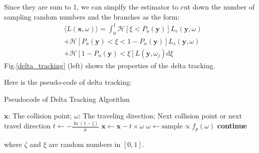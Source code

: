 \documentclass[acmtog]{acmart}
\begin{document}
Since they are sum to 1, we can simplfy the estimator to cut down the number of sampling random numbers and the branches as the form:
\begin{equation}
	\begin{aligned}
		&\langle L(\mathbf x,\omega)\rangle=\int_0^1\mathcal H[\xi<P_a(\mathbf y)]L_e(\mathbf y,\omega)\\
		&+\mathcal H[P_a(\mathbf y)<\xi<1-P_n(\mathbf y)]L_s(\mathbf y,\omega)\\
		&+\mathcal H[1-P_n(\mathbf y)<\xi]L(\mathbf y,\omega_j)\mathrm d\xi
	\end{aligned}
\end{equation}
Fig.\ref{delta_tracking} (left) shows the properties of the delta tracking.


Here is the pseudo-code of delta tracking:
\begin{algorithm}[H]
	\caption{Pseudocode of Delta Tracking Algorithm}
	\begin{algorithmic}[1]
		\Require
			$\mathbf x$: The collision point; $\omega$: The traveling direction;
		\Ensure
			Next collision point or next travel direction
				\State $t\gets-\frac{\ln(1-\zeta)}{\bar\mu}$
				\State $\mathbf x\gets\mathbf x-t\times\omega$
					\State {}
					\State $\omega\gets\mathrm{sample}\propto f_p(\omega)$
				\Else {}
					\State \textbf{continue}
				\EndIf
			\EndWhile
	\end{algorithmic}
\end{algorithm}
where $\zeta$ and $\xi$ are random numbers in $[0,1]$.
\end{document}
